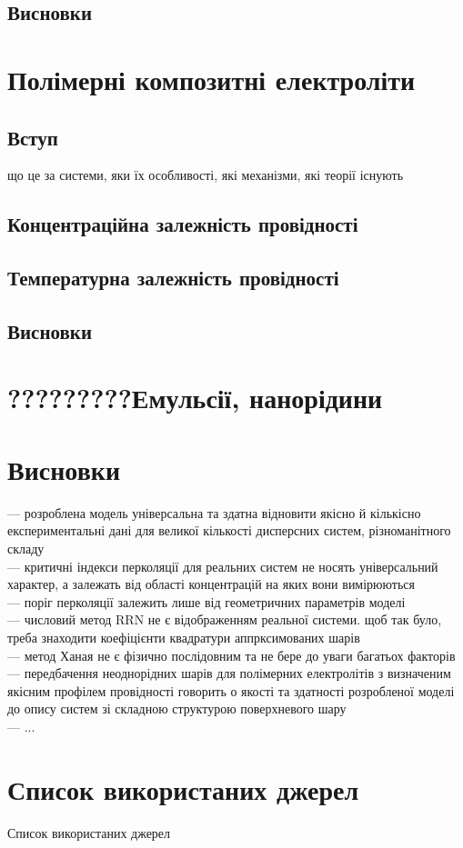 \documentclass[12pt]{vakthesis}
\begin{document}
\section{Висновки}

\chapter{Полімерні композитні електроліти}%
\section{Вступ}
    що це за системи, яки їх особливості, які механізми,
    які теорії існують
\section{Концентраційна залежність провідності}
\section{Температурна залежність провідності}
\section{Висновки}

\chapter{?????????Емульсії, нанорідини}

\chapter*{Висновки}
    --- розроблена модель універсальна та здатна відновити
    якісно й кількісно експериментальні дані для великої
    кількості дисперсних систем, різноманітного складу\\
    --- критичні індекси перколяції для реальних систем не
    носять універсальний характер, а залежать від області
    концентрацій на яких вони вимірюються\\
    --- поріг перколяції залежить лише від геометричних
    параметрів моделі\\
    --- числовий метод RRN не є відображенням реальної
    системи. щоб так було, треба знаходити коефіцієнти
    квадратури аппрксимованих шарів\\
    --- метод Ханая не є фізично послідовним та не бере
    до уваги багатьох факторів\\
    --- передбачення неоднорідних шарів для полімерних
    електролітів з визначеним якісним профілем провідності
    говорить о якості та здатності розробленої моделі
    до опису систем зі складною структурою поверхневого
    шару\\
    --- ...

\chapter*{Список використаних джерел}

\begin{bibset}{Список використаних джерел}
%


\end{bibset}
\end{document}
